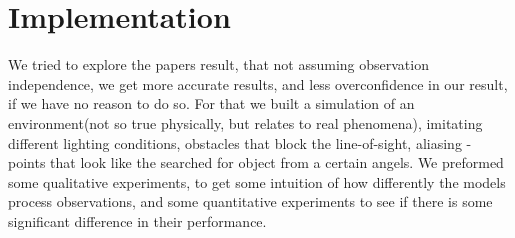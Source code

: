 \documentclass{article}
\begin{document}
	
	
	\section{Implementation}
	
	We tried to explore the papers result, that not assuming observation independence, we get more accurate results, and less overconfidence in our result, if we have no reason to do so.
	For that we built a simulation of an environment(not so true physically, but relates to real phenomena), imitating different lighting conditions, obstacles that block the line-of-sight, aliasing - points that look like the searched for object from a certain angels.
	We preformed some qualitative experiments, to get some intuition of how differently the models process observations, and some quantitative experiments to see if there is some significant difference in their performance.
	
\end{document}
